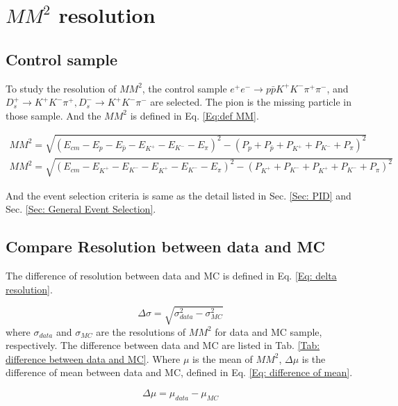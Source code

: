 \section{$MM^{2}$ resolution}
\label{Set: cut on MM}
\subsection{Control sample}

To study the resolution of $MM^{2}$, the control sample $e^{+} e^{-}
\rightarrow p \bar{p} K^{+} K^{-} \pi^{+} \pi^{-}$, and $D^{+}_{s}
\rightarrow K^{+} K^{-} \pi^{+},D^{-} _{s} \rightarrow K^{+} K^{-}
\pi^{-}$ are selected. The pion is the missing particle in those
sample. And the $MM^{2}$ is defined in Eq. \ref{Eq:def MM}.    

\begin{align}
    MM^{2} = \sqrt{ \left( E_{cm} - E_{p} - E_{\bar{p}} - E_{K^{+}} - E_{K^{-}} - E_{\pi} \right)^{2} - 
    \left( P_{p} + P_{\bar{p}} + P_{K^{+}} + P_{K^{-}} + P_{\pi} \right)^{2} } \\
    MM^{2} = \sqrt{ \left( E_{cm} - E_{K^{+}} - E_{K^{-}} - E_{K^{+}} - E_{K^{-}} - E_{\pi} \right)^{2} - 
    \left(  P_{K^{+}} + P_{K^{-}} + P_{K^{+}} + P_{K^{-}} + P_{\pi} \right)^{2} }
    \label{Eq:def MM}
\end{align}

And the event selection criteria is same as the detail listed in Sec.
\ref{Sec: PID} and Sec. \ref{Sec: General Event Selection}.

\subsection*{Compare Resolution between data and MC}
    
The difference of resolution between data and MC is defined in Eq.
\ref{Eq: delta resolution}.

\begin{equation}
    \Delta \sigma = \sqrt{ \sigma_{data}^{2} - \sigma_{MC}^{2} }
    \label{Eq: delta resolution}
\end{equation}
where $\sigma_{data}$ and $\sigma_{MC}$  are the resolutions of
$MM^{2}$ for data and MC sample, respectively.  The difference between
data and MC are listed in Tab. \ref{Tab: difference between data and
MC}. Where $\mu$ is the mean of $MM^{2}$, $\Delta \mu$ is the
difference of mean between data and MC, defined in Eq. \ref{Eq:
difference of mean}.

\begin{equation}
    \Delta \mu = \mu_{data} - \mu_{MC}
    \label{Eq: difference of mean}
\end{equation}

